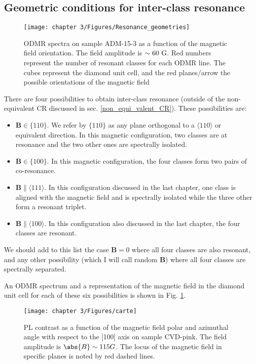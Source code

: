 \documentclass[a4paper,11pt]{report}
\begin{document}
\begin{refsection}
\subsection{Geometric conditions for inter-class resonance}

\begin{figure}[h!]
\centering
\texttt{[image: chapter 3/Figures/Resonance\_geometries]}
\caption{ODMR spectra on sample ADM-15-3 as a function of the magnetic field orientation. The field amplitude is $\sim 60\ \rm G$. Red numbers represent the number of resonant classes for each ODMR line. The cubes represent the diamond unit cell, and the red planes/arrow the possible orientations of the magnetic field}
\label{ODMR_geometries}
\end{figure}

There are four possibilities to obtain inter-class resonance (outside of the non-equivalent CR discussed in sec. \ref{non_equi_valent_CR}). These possibilities are:
\begin{itemize}
\item $\mathbf{B} \in \{110\}$. We refer by $\{110\}$ as any plane orthogonal to a $\langle 110 \rangle$ or equivalent direction. In this magnetic configuration, two classes are at resonance and the two other ones are spectrally isolated.
\item $\mathbf{B} \in \{100\}$. In this magnetic configuration, the four classes form two pairs of co-resonance.
\item $\mathbf{B} \parallel \langle 111 \rangle$. In this configuration discussed in the last chapter, one class is aligned with the magnetic field and is spectrally isolated while the three other form a resonant triplet.
\item $\mathbf{B} \parallel \langle 100 \rangle$. In this configuration also discussed in the last chapter, the four classes are resonant.
\end{itemize}
We should add to this list the case $\mathbf{B}=0$ where all four classes are also resonant, and any other possibility (which I will call random $\mathbf{B}$) where all four classes are spectrally separated. 

An ODMR spectrum and a representation of the magnetic field in the diamond unit cell for each of these six possibilities is shown in Fig. \ref{ODMR_geometries}.

\begin{figure}[h]
\centering
\texttt{[image: chapter 3/Figures/carte]}
\caption{PL contrast as a function of the magnetic field polar and azimuthal angle with respect to the [100] axis on sample CVD-pink. The field amplitude is $\abs{B} \sim 115 G$. The locus of the magnetic field in specific planes is noted by red dashed lines.}
\label{Carte}
\end{figure}


\end{refsection}
\end{document}
